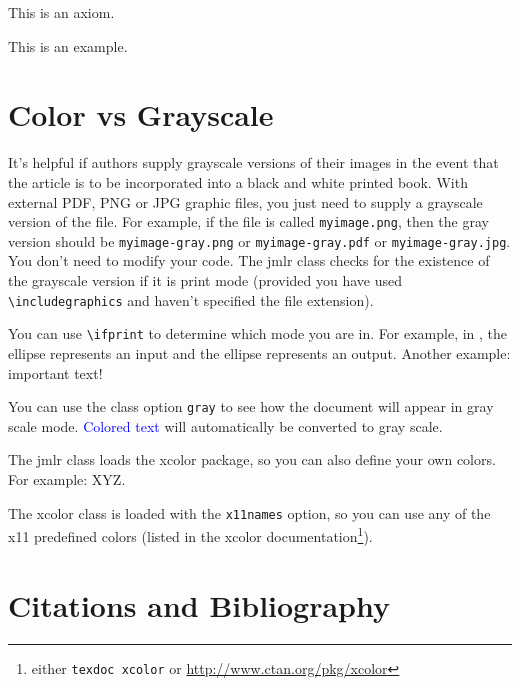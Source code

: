 \documentclass[pmlr]{jmlr}
\begin{document}
\begin{axiom}\label{ax:sample}
This is an axiom.
\end{axiom}

\begin{example}[An Example]\label{ex:sample}
This is an example.
\end{example}

\section{Color vs Grayscale}
\label{sec:color}

It's helpful if authors supply grayscale versions of their
images in the event that the article is to be incorporated into
a black and white printed book. With external PDF, PNG or JPG
graphic files, you just need to supply a grayscale version of the
file. For example, if the file is called \texttt{myimage.png},
then the gray version should be \texttt{myimage-gray.png} or
\texttt{myimage-gray.pdf} or \texttt{myimage-gray.jpg}. You don't
need to modify your code. The \textsf{jmlr} class checks for
the existence of the grayscale version if it is print mode 
(provided you have used \verb|\includegraphics| and haven't
specified the file extension).

You can use \verb|\ifprint| to determine which mode you are in.
For example, in , the 
 ellipse represents an input and the
 ellipse represents an output.
Another example: {\ifprint{\bfseries}{\color{red}}important text!}

You can use the class option \texttt{gray} to see how the
document will appear in gray scale mode. \textcolor{blue}{Colored
text} will automatically be converted to gray scale.

The \textsf{jmlr} class loads the \textsf{xcolor}
package, so you can also define your own colors. For example:
\ifprint
  {}%
  {}%
\textcolor{myred}{XYZ}.

The \textsf{xcolor} class is loaded with the \texttt{x11names}
option, so you can use any of the x11 predefined colors (listed
in the \textsf{xcolor} documentation\footnote{either 
\texttt{texdoc xcolor} or \url{http://www.ctan.org/pkg/xcolor}}).

\section{Citations and Bibliography}
\label{sec:cite}
\end{document}
